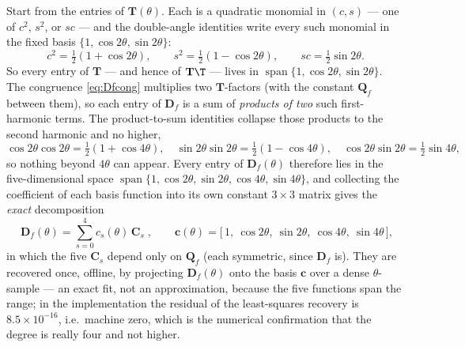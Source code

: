 Start from the entries of $\mathbf T(\theta)$. Each is a quadratic monomial in
$(c,s)$ --- one of $c^2$, $s^2$, or $sc$ --- and the double-angle identities write
every such monomial in the fixed basis $\{1,\cos2\theta,\sin2\theta\}$:
\begin{equation}
  c^2=\tfrac12(1+\cos2\theta),\qquad
  s^2=\tfrac12(1-\cos2\theta),\qquad
  sc=\tfrac12\sin2\theta .
  \label{eq:double}
\end{equation}
So every entry of $\mathbf T$ --- and hence of $\mathbf T\T$ --- lives in
$\operatorname{span}\{1,\cos2\theta,\sin2\theta\}$. The congruence
\eqref{eq:Dfcong} multiplies two $\mathbf T$-factors (with the constant $\mathbf
Q_f$ between them), so each entry of $\mathbf D_f$ is a sum of \emph{products of two}
such first-harmonic terms. The product-to-sum identities collapse those products to
the second harmonic and no higher,
\begin{equation}
  \cos2\theta\cos2\theta=\tfrac12(1+\cos4\theta),\quad
  \sin2\theta\sin2\theta=\tfrac12(1-\cos4\theta),\quad
  \cos2\theta\sin2\theta=\tfrac12\sin4\theta ,
\end{equation}
so nothing beyond $4\theta$ can appear. Every entry of $\mathbf D_f(\theta)$ therefore
lies in the five-dimensional space
$\operatorname{span}\{1,\cos2\theta,\sin2\theta,\cos4\theta,\sin4\theta\}$, and
collecting the coefficient of each basis function into its own constant $3\times3$
matrix gives the \emph{exact} decomposition
\begin{equation}
  \boxed{\;\mathbf D_f(\theta)=\sum_{s=0}^{4}c_s(\theta)\,\mathbf C_s\;},\qquad
  \mathbf c(\theta)=\bigl[\,1,\ \cos2\theta,\ \sin2\theta,\ \cos4\theta,\ \sin4\theta\,\bigr],
  \label{eq:dffourier}
\end{equation}
in which the five $\mathbf C_s$ depend only on $\mathbf Q_f$ (each symmetric, since
$\mathbf D_f$ is). They are recovered once, offline, by projecting $\mathbf
D_f(\theta)$ onto the basis $\mathbf c$ over a dense $\theta$-sample --- an exact fit,
not an approximation, because the five functions span the range; in the
implementation the residual of the least-squares recovery is
$8.5\times10^{-16}$, i.e.\ machine zero, which is the numerical confirmation that the
degree is really four and not higher.

